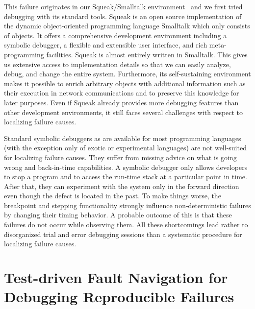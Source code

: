 \documentclass[preprint,3p]{elsarticle}
\begin{document}
This failure originates in our Squeak/Smalltalk environment~\cite{Ingalls1997} and we first tried debugging with its standard tools. 
Squeak is an open source implementation of the dynamic object-oriented programming language Smalltalk which only consists of objects.
It offers a comprehensive development environment including a symbolic debugger, a flexible and extensible user interface, and rich meta-programming facilities. 
Squeak is almost entirely written in Smalltalk. This gives us extensive access to implementation details so that we can easily analyze, debug, and change the entire system. 
Furthermore, its self-sustaining environment makes it possible to enrich arbitrary objects with additional information such as their execution in network communications and to preserve this knowledge for later purposes. 
Even if Squeak already provides more debugging features than other development environments, it still faces several challenges with respect to localizing failure causes. 

Standard symbolic debuggers as are available for most programming languages (with the exception only of exotic or experimental languages) are not well-suited for localizing failure causes. 
They suffer from missing advice on what is going wrong and back-in-time capabilities.
A symbolic debugger only allows developers to stop a program and to access the run-time stack at a particular point in time. 
After that, they can experiment with the system only in the forward direction even though the defect is located in the past. 
To make things worse, the breakpoint and stepping functionality strongly influence non-deterministic failures by changing their timing behavior. 
A probable outcome of this is that these failures do not occur while observing them. 
All these shortcomings lead rather to disorganized trial and error debugging sessions than a systematic procedure for localizing failure causes.



\section{Test-driven Fault Navigation for Debugging Reproducible Failures}
\label{sec:pathTools}
\end{document}
